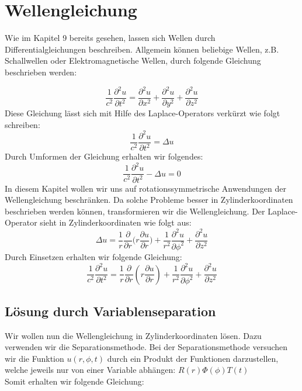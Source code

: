 \section{Wellengleichung}


Wie im Kapitel 9 bereits gesehen, lassen sich Wellen durch Differentialgleichungen beschreiben. Allgemein können beliebige Wellen, z.B. Schallwellen oder Elektromagnetische Wellen, durch folgende Gleichung beschrieben werden:

\begin{equation}
\frac{1}{c^2} \frac{\partial^2 u}{\partial t^2} = \frac{\partial^2 u}{\partial x^2} + \frac{\partial^2 u}{\partial y^2} + \frac{\partial^2 u}{\partial z^2}
\end{equation}
Diese Gleichung lässt sich mit Hilfe des Laplace-Operators verkürzt wie folgt schreiben:%
\begin{equation}
\frac{1}{c^2} \frac{\partial^2 u}{\partial t^2} = \Delta u
\end{equation}
Durch Umformen der Gleichung erhalten wir folgendes:
\begin{equation}
\frac{1}{c^2} \frac{\partial^2 u}{\partial t^2} - \Delta u = 0
\end{equation}
In diesem Kapitel wollen wir uns auf rotationssymmetrische Anwendungen der Wellengleichung beschränken. Da solche Probleme besser in Zylinderkoordinaten beschrieben werden können, transformieren wir die Wellengleichung. Der Laplace-Operator sieht in Zylinderkoordinaten wie folgt aus:
\begin{equation}
\Delta u = \frac{1}{r} \frac{\partial}{\partial r}\biggl(r \frac{\partial u}{\partial r}\biggr) + \frac{1}{r^2} \frac{\partial^2 u}{\partial \phi^2} + \frac{\partial^2 u}{\partial z^2} 
\end{equation} 
Durch Einsetzen erhalten wir folgende Gleichung:
\begin{equation}
\frac{1}{c^2} \frac{\partial^2 u}{\partial t^2} = \frac{1}{r} \frac{\partial}{\partial r}(r \frac{\partial u}{\partial r}) + \frac{1}{r^2} \frac{\partial^2 u}{\partial \phi^2} + \frac{\partial^2 u}{\partial z^2} 
\end{equation}

\subsection[Lösung durch Variablenseparation]{Lösung durch Variablenseparation}

Wir wollen nun die Wellengleichung in Zylinderkoordinaten lösen. Dazu verwenden wir die Separationsmethode.
Bei der Separationsmethode versuchen wir die Funktion $u(r, \phi, t)$ durch ein Produkt der Funktionen darzustellen, welche jeweils nur von einer Variable abhängen: $R(r)\Phi(\phi)T(t)$
\\Somit erhalten wir folgende Gleichung:

